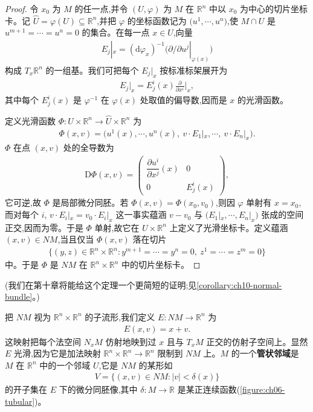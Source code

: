 \documentclass[../../main.tex]{subfiles}
\begin{document}
\begin{proof}
令 $x_0$ 为 $M$ 的任一点,并令 $(U,\varphi)$ 为 $M$ 在 $\mathbb{R}^n$ 中以 $x_0$ 为中心的切片坐标卡。记 $\widehat{U}=\varphi(U)\subseteq\mathbb{R}^n$,并把 $\varphi$ 的坐标函数记为 $\bigl(u^1,\cdots ,u^n\bigr)$,使 $M\cap U$ 是 $u^{m+1}=\cdots=u^n=0$ 的集合。在每一点 $x\in U$,向量
\begin{align*}
E_j|_x=(\mathrm{d}\varphi_x)^{-1}\bigl(\partial/\partial u^j|_{\varphi(x)}\bigr)
\end{align*}
构成 $T_x\mathbb{R}^n$ 的一组基。我们可把每个 $E_j|_x$ 按标准标架展开为
\begin{align*}
E_j|_x=E^i_j(x)\frac{\partial}{\partial x^i}\bigg|_x,
\end{align*}
其中每个 $E^i_j(x)$ 是 $\varphi^{-1}$ 在 $\varphi(x)$ 处取值的偏导数,因而是 $x$ 的光滑函数。

定义光滑函数 $\Phi:U\times\mathbb{R}^n\to\widehat{U}\times\mathbb{R}^n$ 为
\begin{align*}
\Phi(x,v)=\bigl(u^1(x),\cdots ,u^n(x),\ v\cdot E_1|_x,\cdots ,\ v\cdot E_n|_x\bigr).
\end{align*}
$\Phi$ 在点 $(x,v)$ 处的全导数为
\begin{align*}
\mathrm{D}\Phi(x,v)=
\begin{pmatrix}
\dfrac{\partial u^i}{\partial x^j}(x) & 0\\
0 & E^i_j(x)
\end{pmatrix},
\end{align*}
它可逆,故 $\Phi$ 是局部微分同胚。若 $\Phi(x,v)=\Phi(x_0,v_0)$,则因 $\varphi$ 单射有 $x=x_0$,而对每个 $i$, $v\cdot E_i|_x=v_0\cdot E_i|_x$ 这一事实蕴涵 $v-v_0$ 与 $\bigl(E_1|_x,\cdots ,E_n|_x\bigr)$ 张成的空间正交,因而为零。于是 $\Phi$ 单射,故它在 $U\times\mathbb{R}^n$ 上定义了光滑坐标卡。定义蕴涵 $(x,v)\in NM$,当且仅当 $\Phi(x,v)$ 落在切片
\begin{align*}
\{(y,z)\in\mathbb{R}^n\times\mathbb{R}^n:y^{m+1}=\cdots=y^n=0,\ z^1=\cdots=z^m=0\}
\end{align*}
中。于是 $\Phi$ 是 $NM$ 在 $\mathbb{R}^n\times\mathbb{R}^n$ 中的切片坐标卡。
\end{proof}

(我们在第十章将能给这个定理一个更简短的证明;见\cref{corollary:ch10-normal-bundle}。)

把 $NM$ 视为 $\mathbb{R}^n\times\mathbb{R}^n$ 的子流形,我们定义 $E:NM\to\mathbb{R}^n$ 为
\begin{align*}
E(x,v)=x+v.
\end{align*}
这映射把每个法空间 $N_xM$ 仿射地映到过 $x$ 且与 $T_xM$ 正交的仿射子空间上。显然 $E$ 光滑,因为它是加法映射 $\mathbb{R}^n\times\mathbb{R}^n\to\mathbb{R}^n$ 限制到 $NM$ 上。$M$ 的一个\textbf{管状邻域}是 $M$ 在 $\mathbb{R}^n$ 中的一个邻域 $U$,它是 $NM$ 的某形如
\begin{align}\label{align:ch06-tubular-V}
V=\{(x,v)\in NM:|v|<\delta(x)\}
\end{align}
的开子集在 $E$ 下的微分同胚像,其中 $\delta:M\to\mathbb{R}$ 是某正连续函数(\cref{figure:ch06-tubular})。
\end{document}
